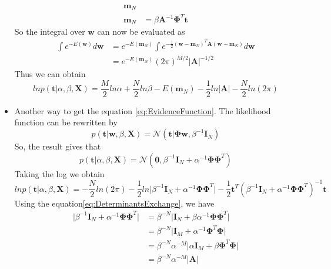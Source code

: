 \documentclass[12pt, a4paper]{article}
\newcommand{\N}{\mathcal{N}}
\begin{document}
\begin{itemize}
\begin{align*}
            \bm{m}_N\\
            \bm{m}_N&=\beta\bm{A}^{-1}\bm{\Phi}^T\bm{t}
        \end{align*}
        So the integral over $\bm{w}$ can now be evaluated as 
        \begin{align*}
            \int e^{-E(\bm{w})}d\bm{w}&=e^{-E(\bm{m}_N)}\int e^{-\frac{1}{2}(\bm{w}-\bm{m}_N)^T\bm{A}
            (\bm{w}-\bm{m}_N)}d\bm{w}\\
            &=e^{-E(\bm{m}_N)}(2\pi)^{M/2}\vert\bm{A}\vert^{-1/2}
        \end{align*}
        Thus we can obtain
        \begin{equation}
            \label{eq:EvidenceFunction}
            lnp(\bm{t}|\alpha,\beta,\bm{X})=\frac{M}{2}ln\alpha+\frac{N}{2}ln\beta-E(\bm{m}_N)-
            \frac{1}{2}ln\vert\bm{A}\vert-\frac{N}{2}ln(2\pi)
        \end{equation}
        \item Another way to get the equation \ref{eq:EvidenceFunction}. The likelihood function can
        be rewritten by
        \begin{equation*}
            p(\bm{t}|\bm{w},\beta,\bm{X})=\N(\bm{t}|\bm{\Phi}\bm{w},\beta^{-1}\bm{I}_N)
        \end{equation*}
        So, the result gives that
        \begin{equation*}
            p(\bm{t}|\alpha,\beta,\bm{X})=\N(\bm{0},\beta^{-1}\bm{I}_N+\alpha^{-1}\bm{\Phi}\bm{\Phi}^T)
        \end{equation*}
        Taking the log we obtain
        \begin{equation*}
            lnp(\bm{t}|\alpha,\beta,\bm{X})=-\frac{N}{2}ln(2\pi)-\frac{1}{2}ln\vert\beta^{-1}\bm{I}_N+
            \alpha^{-1}\bm{\Phi}\bm{\Phi}^T\vert-\frac{1}{2}\bm{t}^T(\beta^{-1}\bm{I}_N+\alpha^{-1}
            \bm{\Phi}\bm{\Phi}^T)^{-1}\bm{t}
        \end{equation*}
        Using the equation\ref{eq:DeterminantsExchange}, we have 
        \begin{align*}
            \vert\beta^{-1}\bm{I}_N+\alpha^{-1}\bm{\Phi}\bm{\Phi}^T\vert&=\beta^{-N}
            \vert\bm{I}_N+\beta\alpha^{-1}\bm{\Phi}\bm{\Phi}^T\vert\\
            &=\beta^{-N}\vert\bm{I}_M+\alpha^{-1}\bm{\Phi}^T\bm{\Phi}\vert\\
            &=\beta^{-N}\alpha^{-M}\vert\alpha\bm{I}_M+\beta\bm{\Phi}^T\bm{\Phi}\vert\\
            &=\beta^{-N}\alpha^{-M}\vert\bm{A}\vert

\end{align*}
\end{itemize}
\end{document}
